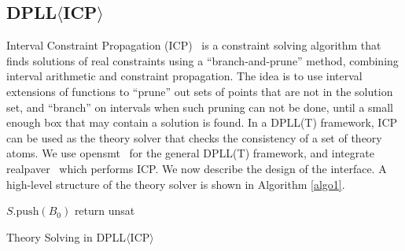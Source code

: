 \documentclass[envcountsect]{llncs}
\begin{document}
\subsection{DPLL$\langle$ICP$\rangle$}

Interval Constraint Propagation (ICP)~\cite{handbookICP} is a constraint solving
algorithm that finds
solutions of real constraints using a ``branch-and-prune'' method, combining
interval arithmetic and constraint propagation. The idea is to use interval
extensions of functions to ``prune'' out sets of points that are not in the
solution set, and ``branch'' on intervals when such pruning can not be done,
until a small enough box that may contain a solution is found. In a DPLL(T) framework, ICP can be used as the theory solver that checks the
consistency of a set of theory atoms. We use
{\sf opensmt}~\cite{DBLP:conf/tacas/BruttomessoPST10} for the
general
DPLL(T) framework, and integrate {\sf realpaver}~\cite{DBLP:journals/toms/GranvilliersB06} which performs ICP. We now describe the design of the interface. A high-level structure of the theory solver is shown in Algorithm \ref{algo1}. 
\begin{algorithm}[h!]
\BlankLine
$S.\mathrm{push}(B_0)$\;
\While{$S\neq \emptyset$}{\label{while}
$B\leftarrow S.\mathrm{pop}()$ \;
\While{$\exists 1\leq i \leq m, B\neq \mathrm{Prune}(B,c_i)$}{ 
\CommentSty{//Pruning without branching, used as the assert() function.}
	$B\leftarrow\mathrm{Prune}(B, c_i)$\;
}
\CommentSty{//The $\varepsilon$ below is computed from $\delta$ and the Lipschitz constants of functions beforehand.}\\
\If{$B\neq \emptyset$}
{\eIf{$\exists 1\leq i\leq n, |I_i|\geq \varepsilon$}
{$\{B_1,B_2\}\leftarrow \mathrm{Branch}(B, i)$;\CommentSty{  //Splitting on the intervals}
$S.\mathrm{push}(\{B_1,B_2\})$\;}{
return {\sf $\delta$-sat}; \CommentSty{   //Complete check() is successful.}}}
}
return {\sf unsat}\;
\caption{Theory Solving in DPLL$\langle$ICP$\rangle$}\label{algo1}
\end{algorithm}
\end{document}
